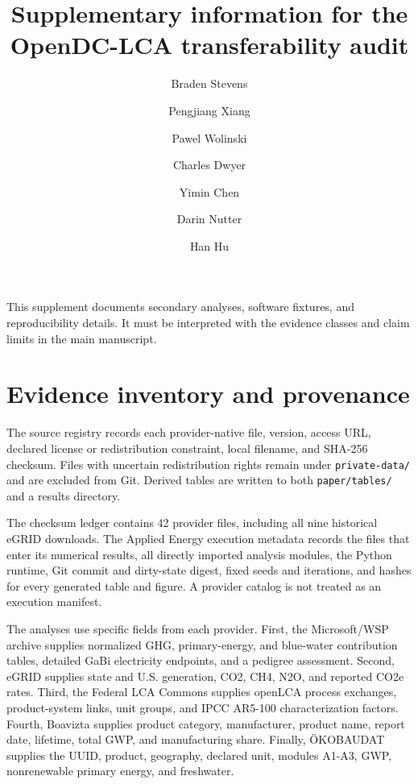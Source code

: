 \documentclass[review,12pt]{elsarticle}
\begin{document}
\begin{frontmatter}
\title{Supplementary information for the OpenDC-LCA transferability audit}
\author[uark,hfa]{Braden Stevens}
\author[uark,hfa]{Pengjiang Xiang}
\author[ahpcc]{Pawel Wolinski}
\author[its]{Charles Dwyer}
\author[ornl]{Yimin Chen}
\author[uark]{Darin Nutter}
\author[uark]{Han Hu}
\address[uark]{Department of Mechanical Engineering, University of Arkansas, Fayetteville, AR 72701, U.S.}
\address[ahpcc]{Arkansas High Performance Computing Center, University of Arkansas, Fayetteville, AR 72701, U.S.}
\address[its]{IT Services, University of Arkansas, Fayetteville, AR 72701, U.S.}
\address[ornl]{Building Technologies Research and Integration Center, Oak Ridge National Laboratory, Oak Ridge, TN 37830, U.S.}
\address[hfa]{Harrison French \& Associates Ltd., Bentonville, AR 72712, U.S.}
\end{frontmatter}

This supplement documents secondary analyses, software fixtures, and reproducibility details. It must be interpreted with the evidence classes and claim limits in the main manuscript.

\section{Evidence inventory and provenance}
The source registry records each provider-native file, version, access URL, declared license or redistribution constraint, local filename, and SHA-256 checksum. Files with uncertain redistribution rights remain under \texttt{private-data/} and are excluded from Git. Derived tables are written to both \texttt{paper/tables/} and a results directory.

The checksum ledger contains 42 provider files, including all nine historical eGRID downloads. The Applied Energy execution metadata records the files that enter its numerical results, all directly imported analysis modules, the Python runtime, Git commit and dirty-state digest, fixed seeds and iterations, and hashes for every generated table and figure. A provider catalog is not treated as an execution manifest.

The analyses use specific fields from each provider. First, the Microsoft/WSP archive supplies normalized GHG, primary-energy, and blue-water contribution tables, detailed GaBi electricity endpoints, and a pedigree assessment. Second, eGRID supplies state and U.S. generation, CO2, CH4, N2O, and reported CO2e rates. Third, the Federal LCA Commons supplies openLCA process exchanges, product-system links, unit groups, and IPCC AR5-100 characterization factors. Fourth, Boavizta supplies product category, manufacturer, product name, report date, lifetime, total GWP, and manufacturing share. Finally, ÖKOBAUDAT supplies the UUID, product, geography, declared unit, modules A1-A3, GWP, nonrenewable primary energy, and freshwater.
\end{document}
